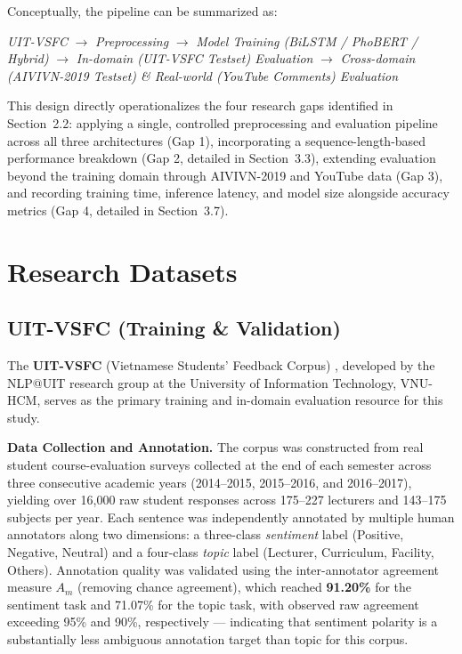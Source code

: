 \documentclass[12pt]{report} %
\begin{document}
Conceptually, the pipeline can be summarized as:
\begin{center}
    \textit{UIT-VSFC} $\rightarrow$ \textit{Preprocessing} $\rightarrow$ \textit{Model Training (BiLSTM / PhoBERT / Hybrid)} $\rightarrow$ \textit{In-domain (UIT-VSFC Testset) Evaluation} $\rightarrow$ \textit{Cross-domain (AIVIVN-2019 Testset) \& Real-world (YouTube Comments) Evaluation}
\end{center}

This design directly operationalizes the four research gaps identified in Section~2.2: applying a single, controlled preprocessing and evaluation pipeline across all three architectures (Gap 1), incorporating a sequence-length-based performance breakdown (Gap 2, detailed in Section~3.3), extending evaluation beyond the training domain through AIVIVN-2019 and YouTube data (Gap 3), and recording training time, inference latency, and model size alongside accuracy metrics (Gap 4, detailed in Section~3.7).

\section{Research Datasets}
\subsection{UIT-VSFC (Training \& Validation)}

The \textbf{UIT-VSFC} (Vietnamese Students' Feedback Corpus) \cite{nguyen2018uitvsfc}, developed by the NLP@UIT research group at the University of Information Technology, VNU-HCM, serves as the primary training and in-domain evaluation resource for this study.

\textbf{Data Collection and Annotation.} The corpus was constructed from real student course-evaluation surveys collected at the end of each semester across three consecutive academic years (2014--2015, 2015--2016, and 2016--2017), yielding over 16,000 raw student responses across 175--227 lecturers and 143--175 subjects per year. Each sentence was independently annotated by multiple human annotators along two dimensions: a three-class \textit{sentiment} label (Positive, Negative, Neutral) and a four-class \textit{topic} label (Lecturer, Curriculum, Facility, Others). Annotation quality was validated using the inter-annotator agreement measure $A_m$ (removing chance agreement), which reached \textbf{91.20\%} for the sentiment task and 71.07\% for the topic task, with observed raw agreement exceeding 95\% and 90\%, respectively --- indicating that sentiment polarity is a substantially less ambiguous annotation target than topic for this corpus.
\end{document}
